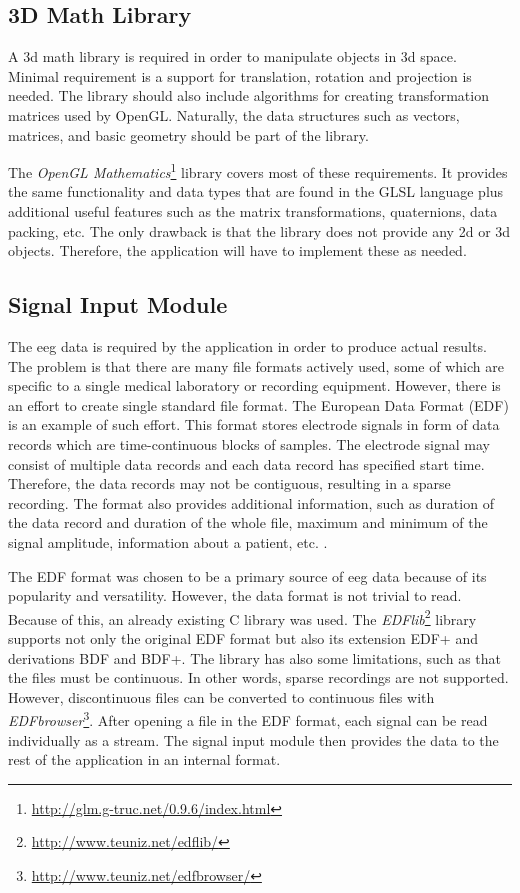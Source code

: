 \subsection{3D Math Library}
A \gls{3d} math library is required in order to manipulate objects in \gls{3d} space. Minimal requirement is a support for translation, rotation and projection is needed. The library should also include algorithms for creating transformation matrices used by OpenGL. Naturally, the data structures such as vectors, matrices, and basic geometry should be part of the library.

The \emph{OpenGL Mathematics}\footnote{\url{http://glm.g-truc.net/0.9.6/index.html}} library covers most of these requirements. It provides the same functionality and data types that are found in the GLSL language plus additional useful features such as the matrix transformations, quaternions, data packing, etc. The only drawback is that the library does not provide any \gls{2d} or \gls{3d} objects. Therefore, the application will have to implement these as needed. 

\subsection{Signal Input Module}
The \gls{eeg} data is required by the application in order to produce actual results. The problem is that there are many file formats actively used, some of which are specific to a single medical laboratory or recording equipment. However, there is an effort to create single standard file format. The European Data Format (EDF) is an example of such effort. This format stores electrode signals in form of data records which are time-continuous blocks of samples. The electrode signal may consist of multiple data records and each data record has specified start time. Therefore, the data records may not be contiguous, resulting in a sparse recording. The format also provides additional information, such as duration of the data record and duration of the whole file, maximum and minimum of the signal amplitude, information about a patient, etc. \cite{edfFormat}. 

The EDF format was chosen to be a primary source of \gls{eeg} data because of its popularity and versatility. However, the data format is not trivial to read. Because of this, an already existing C library was used. The \emph{EDFlib}\footnote{\url{http://www.teuniz.net/edflib/}} library supports not only the original EDF format but also its extension EDF+ and derivations BDF and BDF+. The library has also some limitations, such as that the files must be continuous. In other words, sparse recordings are not supported. However, discontinuous files can be converted to continuous files with \emph{EDFbrowser}\footnote{\url{http://www.teuniz.net/edfbrowser/}}. After opening a file in the EDF format, each signal can be read individually as a stream. The signal input module then provides the data to the rest of the application in an internal format.

